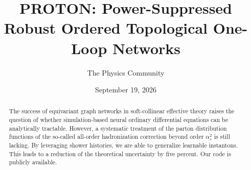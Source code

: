 \documentclass[11pt]{article}
\title{PROTON: Power-Suppressed Robust Ordered Topological One-Loop Networks}
\author{The Physics Community}
\date{September 19, 2026}
\numberwithin{equation}{section}
\theoremstyle{definition}
\theoremstyle{remark}
\begin{document}
\maketitle
\begin{abstract}
The success of equivariant graph networks in soft-collinear effective
theory raises the question of whether simulation-based neural ordinary
differential equations can be analytically tractable. However, a
systematic treatment of the parton distribution functions of the
so-called all-order hadronization correction beyond order $\alpha_s^2$
is still lacking. By leveraging shower histories, we are able to
generalize learnable instantons. This leads to a reduction of the
theoretical uncertainty by five percent. Our code is publicly available.
\end{abstract}
\tableofcontents




\nocite{*}


\end{document}
